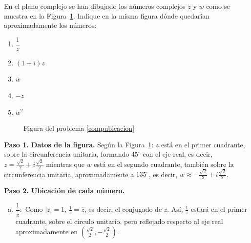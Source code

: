 \begin{prob}\label{compubicacion}
En el plano complejo se han dibujado los números complejos $z$ y $w$ como se muestra en la Figura~\ref{fig:compubicacion_datos}. Indique en la misma figura dónde quedarían aproximadamente los números:


\begin{enumerate}[$a)$]
\item $\dfrac{1}{z}$
\item $(1+i)z$
\item $\overline{w}$ 
\item $-z$ 
\item $w^2$
\end{enumerate}		
		
\begin{figure}[!htbp]
\centering
{}
\caption{Figura del problema \ref{compubicacion}}
\label{fig:compubicacion_datos}
\end{figure}
\begin{myproof}
\textbf{Paso 1. Datos de la figura.} Según la Figura~\ref{fig:compubicacion_datos}: $z$ está en el primer cuadrante, sobre la circunferencia unitaria, formando $45^\circ$ con el eje real, es decir, $z = \frac{\sqrt{2}}{2} + i\frac{\sqrt{2}}{2}$ mientras que $w$ está en el segundo cuadrante, también sobre la circunferencia unitaria, aproximadamente a $135^\circ$, es decir, $w \approx -\frac{\sqrt{2}}{2} + i\frac{\sqrt{2}}{2}$.

\textbf{Paso 2. Ubicación de cada número.}

\begin{enumerate}[a)]
\item $\dfrac{1}{z}:$ Como $|z|=1$, $\frac{1}{z} = \overline{z}$, es decir, el conjugado de $z$. Así, $\frac{1}{z}$ estará en el primer cuadrante, sobre el círculo unitario, pero reflejado respecto al eje real aproximadamente en $(\frac{\sqrt{2}}{2}, -\frac{\sqrt{2}}{2})$.


\end{enumerate}
\end{myproof}
\end{prob}
